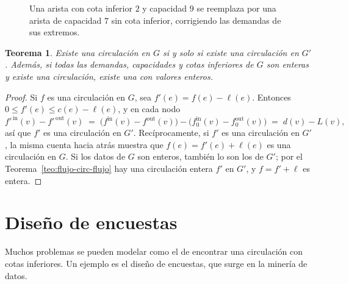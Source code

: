 \documentclass[12pt, spanish, oneside, openany]{book}
\theoremstyle{uprightplain}
\newtheorem{teorema}{Teorema}[section]
\theoremstyle{definition}
\theoremstyle{remark}
\theoremstyle{definition}
\begin{document}
\begin{figure}[H]
\centering
{}
\caption{Una arista con cota inferior $2$ y capacidad $9$ se reemplaza por una
arista de capacidad $7$ sin cota inferior, corrigiendo las demandas de sus
extremos.}
\label{fig:flujo-cotas}
\end{figure}

\begin{teorema}
\label{teo:flujo-cotas}
Existe una circulación en $G$ si y solo si existe una circulación en $G'$. Además, si todas las demandas, capacidades y cotas inferiores de $G$ son enteras y existe una circulación, existe una con valores enteros.
\end{teorema}
\begin{proof}
Si $f$ es una circulación en $G$, sea $f'(e)=f(e)-\ell(e)$. Entonces $0\le f'(e)\le c(e)-\ell(e)$, y en cada nodo
\[
f'^{\,\mathrm{in}}(v)-f'^{\,\mathrm{out}}(v)\;=\;\bigl(f^{\mathrm{in}}(v)-f^{\mathrm{out}}(v)\bigr)-\bigl(f_0^{\mathrm{in}}(v)-f_0^{\mathrm{out}}(v)\bigr)\;=\;d(v)-L(v),
\]
así que $f'$ es una circulación en $G'$. Recíprocamente, si $f'$ es una circulación en $G'$, la misma cuenta hacia atrás muestra que $f(e)=f'(e)+\ell(e)$ es una circulación en $G$. Si los datos de $G$ son enteros, también lo son los de $G'$; por el Teorema~\ref{teo:flujo-circ-flujo} hay una circulación entera $f'$ en $G'$, y $f=f'+\ell$ es entera.
\end{proof}


\section{Diseño de encuestas}
\label{sec:flujo-encuestas}

Muchos problemas se pueden modelar como el de encontrar una circulación con cotas inferiores. Un ejemplo es el diseño de encuestas, que surge en la minería de datos.
\end{document}
